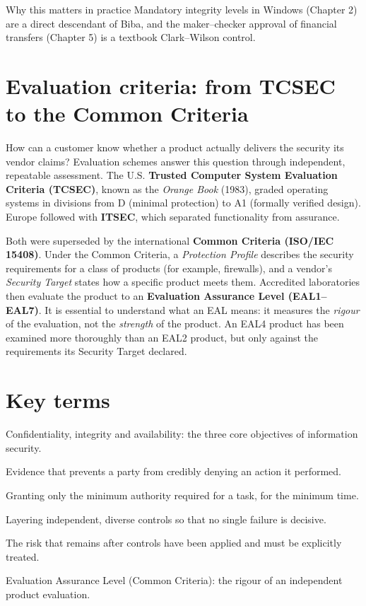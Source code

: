 \documentclass[11pt,openany]{book}
\begin{document}
\begin{notebox}{Why this matters in practice}
Mandatory integrity levels in Windows (Chapter 2) are a direct descendant of Biba, and the maker–checker approval of financial transfers (Chapter 5) is a textbook Clark–Wilson control.
\end{notebox}

\section{Evaluation criteria: from TCSEC to the Common Criteria}\label{sec:1.8}
How can a customer know whether a product actually delivers the security its vendor claims? Evaluation schemes answer this question through independent, repeatable assessment. The U.S. \textbf{Trusted Computer System Evaluation Criteria (TCSEC)}, known as the \emph{Orange Book} (1983), graded operating systems in divisions from D (minimal protection) to A1 (formally verified design). Europe followed with \textbf{ITSEC}, which separated functionality from assurance.

Both were superseded by the international \textbf{Common Criteria (ISO/IEC 15408)}. Under the Common Criteria, a \emph{Protection Profile} describes the security requirements for a class of products (for example, firewalls), and a vendor's \emph{Security Target} states how a specific product meets them. Accredited laboratories then evaluate the product to an \textbf{Evaluation Assurance Level (EAL1–EAL7)}. It is essential to understand what an EAL means: it measures the \emph{rigour} of the evaluation, not the \emph{strength} of the product. An EAL4 product has been examined more thoroughly than an EAL2 product, but only against the requirements its Security Target declared.

\section*{Key terms}
\begin{description}[style=nextline,leftmargin=1.2em]
  \item[CIA triad] Confidentiality, integrity and availability: the three core objectives of information security.
  \item[Non-repudiation] Evidence that prevents a party from credibly denying an action it performed.
  \item[Least privilege] Granting only the minimum authority required for a task, for the minimum time.
  \item[Defence in depth] Layering independent, diverse controls so that no single failure is decisive.
  \item[Residual risk] The risk that remains after controls have been applied and must be explicitly treated.
  \item[EAL] Evaluation Assurance Level (Common Criteria): the rigour of an independent product evaluation.
\end{description}
\end{document}
